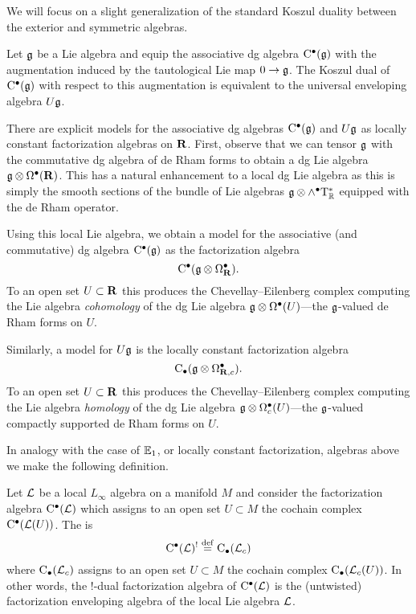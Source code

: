 \documentclass[11pt]{amsart}
\begin{document}
We will focus on a slight generalization of the standard Koszul duality between the exterior and symmetric algebras.

\begin{prop}
Let $\mathfrak{g}$ be a Lie algebra and equip the associative dg algebra ${\rm C}^\bullet(\mathfrak g)$ with the augmentation induced by the tautological Lie map $0 \to \mathfrak{g}$.
The Koszul dual of ${\rm C}^\bullet(\mathfrak{g})$ with respect to this augmentation is equivalent to the universal enveloping algebra $U \mathfrak g$. 
\end{prop}

There are explicit models for the associative dg algebras ${\rm C}^\bullet(\mathfrak{g})$ and $U \mathfrak{g}$ as locally constant factorization algebras on $\mathbf{R}$.
First, observe that we can tensor $\mathfrak g$ with the commutative dg algebra of de Rham forms to obtain a dg Lie algebra $\mathfrak g \otimes \Omega^\bullet(\mathbf{R})$. 
This has a natural enhancement to a local dg Lie algebra as this is simply the smooth sections of the bundle of Lie algebras $\mathfrak g \otimes \wedge^\bullet {\rm T}^*_\mathbb R$ equipped with the de Rham operator.

Using this local Lie algebra, we obtain a model for the associative (and commutative) dg algebra ${\rm C}^\bullet(\mathfrak g)$ as the factorization algebra
\[
{\rm C}^\bullet(\mathfrak g \otimes \Omega^\bullet_{\mathbf{R}}).
\]
To an open set $U \subset \mathbf{R}$ this produces the Chevellay--Eilenberg complex computing the Lie algebra {\em cohomology} of the dg Lie algebra $\mathfrak g \otimes \Omega^\bullet(U)$---the $\mathfrak g$-valued de Rham forms on $U$.
 
Similarly, a model for $U \mathfrak g$ is the locally constant factorization algebra
\[
{\rm C}_\bullet(\mathfrak g \otimes \Omega^\bullet_{\mathbf{R},c}).
\]
To an open set $U \subset \mathbf{R}$ this produces the Chevellay--Eilenberg complex computing the Lie algebra {\em homology} of the dg Lie algebra $\mathfrak g \otimes \Omega^\bullet_c(U)$---the $\mathfrak g$-valued compactly supported de Rham forms on $U$.

\parsec[s:generalkoszul]

In analogy with the case of $\mathbb E_1$, or locally constant factorization, algebras above we make the following definition. 

\begin{dfn}
Let $\mathcal L$ be a local $L_\infty$ algebra on a manifold $M$ and consider the factorization algebra ${\rm C}^\bullet(\mathcal L)$ which assigns to an open set $U \subset M$ the cochain complex ${\rm C}^\bullet(\mathcal L(U))$. 
The  is 
\[
{\rm C}^\bullet(\mathcal L)^! \overset{\rm def}{=} {\rm C}_\bullet (\mathcal L_{c}) 
\]
where ${\rm C}_\bullet(\mathcal L_c)$ assigns to an open set $U \subset M$ the cochain complex ${\rm C}_\bullet(\mathcal L_c(U))$.
In other words, the $!$-dual factorization algebra of ${\rm C}^\bullet(\mathcal L)$ is the (untwisted) factorization enveloping algebra of the local Lie algebra $\mathcal L$. 
\end{dfn} 
\end{document}
